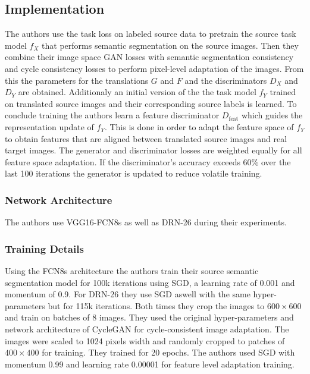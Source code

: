 \subsection{Implementation}
The authors use the task loss on labeled source data to pretrain the source task model $f_X$ that performs semantic segmentation on the source images. Then they combine their image space GAN losses with semantic segmentation consistency and cycle consistency losses to perform pixel-level adaptation of the images. From this the parameters for the translations $G$ and $F$ and the discriminators $D_X$ and $D_Y$ are obtained. Additionaly an initial version of the the task model $f_Y$ trained on translated source images and their corresponding source labels is learned. To conclude training the authors learn a feature discriminator $D_{\text{feat}}$ which guides the representation update of $f_Y$. This is done in order to adapt the feature space of $f_Y$ to obtain features that are aligned between translated source images and real target images. The generator and discriminator losses are weighted equally for all feature space adaptation. If the discriminator's accuracy exceeds $60\%$ over the last 100 iterations the generator is updated to reduce volatile training. 

\subsubsection{Network Architecture}
The authors use VGG16-FCN8s \cite{DBLP:journals/corr/LongSD14} as well as DRN-26 \cite{DBLP:journals/corr/YuKF17} during their experiments. 

\subsubsection{Training Details}
Using the FCN8s architecture the authors train their source semantic segmentation model for 100k iterations using SGD, a learning rate of 0.001 and momentum of 0.9. For DRN-26 they use SGD aswell with the same hyper-parameters but for 115k iterations. Both times they crop the images to $600 \times 600$ and train on batches of 8 images. They used the original hyper-parameters and network architecture of CycleGAN \cite{DBLP:journals/corr/ZhuPIE17} for cycle-consistent image adaptation. The images were scaled to 1024 pixels width and randomly cropped to patches of $400 \times 400$ for training. They trained for 20 epochs. The authors used SGD with momentum 0.99 and learning rate 0.00001 for feature level adaptation training. %


